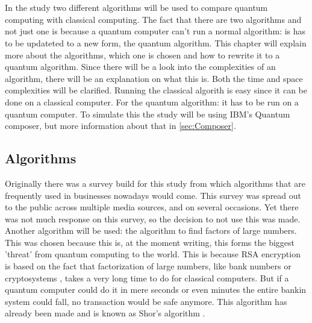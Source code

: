 
\chapter{}
\label{ch:methodologie}


In the study two different algorithms will be used to compare quantum computing with classical computing. 
The fact that there are two algorithms and not just one is because a quantum computer can't run a normal algorithm: is has to be updateted to a new form, the quantum algorithm.
This chapter will explain more about the algorithms, which one is chosen and how to rewrite it to a quantum algorithm. Since there will be a look into the complexities of an algorithm, there will be an explanation on what this is.
Both the time and space complexities will be clarified. Running the classical algorith is easy since it can be done on a classical computer. For the quantum algorithm: it has to be run on a quantum computer.
To simulate this the study will be using IBM's Quantum composer, but more information about that in \ref{sec:Composer}.
\section{Algorithms}
Originally there was a survey build for this study from which algorithms that are frequently used in businesses nowadays would come. This survey was spread out to the public across multiple media sources, and on several occasions.
Yet there was not much response on this survey, so the decision to not use this was made. Another algorithm will be used: the algorithm to find factors of large numbers. This was chosen because this is, at the moment writing, this forms the biggest 'threat' from quantum computing to the world.
This is because RSA encryption is based on the fact that factorization of large numbers, like bank numbers or cryptosystems \autocite{Shor}, takes a very long time to do for classical computers. But if a quantum computer could do it in mere seconds or even minutes the entire bankin system could fall, no transaction would be safe anymore.
This algorithm has already been made and is known as Shor's algorithm \autocite{Shor}.
